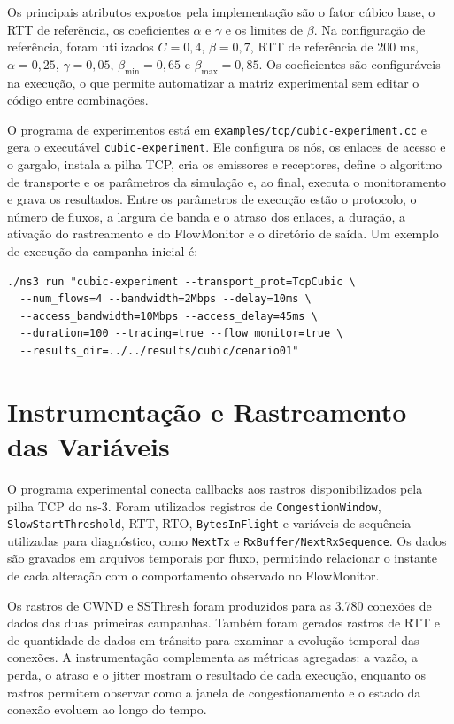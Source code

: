 Os principais atributos expostos pela implementação são o fator cúbico base, o RTT de referência, os coeficientes $\alpha$ e $\gamma$ e os limites de $\beta$. Na configuração de referência, foram utilizados $C=0{,}4$, $\beta=0{,}7$, RTT de referência de 200 ms, $\alpha=0{,}25$, $\gamma=0{,}05$, $\beta_{\min}=0{,}65$ e $\beta_{\max}=0{,}85$. Os coeficientes são configuráveis na execução, o que permite automatizar a matriz experimental sem editar o código entre combinações.

O programa de experimentos está em \texttt{examples/tcp/cubic-experiment.cc} e gera o executável \texttt{cubic-experiment}. Ele configura os nós, os enlaces de acesso e o gargalo, instala a pilha TCP, cria os emissores e receptores, define o algoritmo de transporte e os parâmetros da simulação e, ao final, executa o monitoramento e grava os resultados. Entre os parâmetros de execução estão o protocolo, o número de fluxos, a largura de banda e o atraso dos enlaces, a duração, a ativação do rastreamento e do FlowMonitor e o diretório de saída. Um exemplo de execução da campanha inicial é:

\begin{verbatim}
./ns3 run "cubic-experiment --transport_prot=TcpCubic \
  --num_flows=4 --bandwidth=2Mbps --delay=10ms \
  --access_bandwidth=10Mbps --access_delay=45ms \
  --duration=100 --tracing=true --flow_monitor=true \
  --results_dir=../../results/cubic/cenario01"
\end{verbatim}

\section{Instrumentação e Rastreamento das Variáveis}

O programa experimental conecta callbacks aos rastros disponibilizados pela pilha TCP do ns-3. Foram utilizados registros de \texttt{CongestionWindow}, \texttt{SlowStartThreshold}, RTT, RTO, \texttt{BytesInFlight} e variáveis de sequência utilizadas para diagnóstico, como \texttt{NextTx} e \texttt{RxBuffer/NextRxSequence}. Os dados são gravados em arquivos temporais por fluxo, permitindo relacionar o instante de cada alteração com o comportamento observado no FlowMonitor.

Os rastros de CWND e SSThresh foram produzidos para as 3.780 conexões de dados das duas primeiras campanhas. Também foram gerados rastros de RTT e de quantidade de dados em trânsito para examinar a evolução temporal das conexões. A instrumentação complementa as métricas agregadas: a vazão, a perda, o atraso e o jitter mostram o resultado de cada execução, enquanto os rastros permitem observar como a janela de congestionamento e o estado da conexão evoluem ao longo do tempo.

